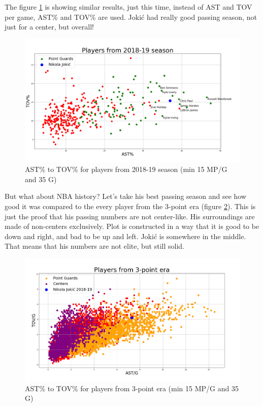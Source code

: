 \documentclass[a4paper]{article}
\begin{document}
The figure \ref{plt:ast_tov_pct} is showing similar results, just this time, instead of AST and TOV per game, AST\% and TOV\% are used. Joki\' c had really good passing season, not just for a center, but overall!

\begin{figure}[h!]
\begin{center}
\includegraphics[scale=0.30]{ast_tov_pct_2019.png}
\end{center}
\caption{AST\% to TOV\% for players from 2018-19 season (min 15 MP/G and 35 G)}
\label{plt:ast_tov_pct}
\end{figure}

But what about NBA history? Let's take his best passing season and see how good it was compared to the every player from the 3-point era (figure \ref{plt:ast_tov_g_3p}). This is just the proof that his passing numbers are not center-like. His surroundings are made of non-centers exclusively. Plot is constructed in a way that it is good to be down and right, and bad to be up and left. Joki\' c is somewhere in the middle. That means that his numbers are not elite, but still solid.

\begin{figure}[h!]
\begin{center}
\includegraphics[scale=0.30]{ast_tov_g_3point_era.png}
\end{center}
\caption{AST\% to TOV\% for players from 3-point era (min 15 MP/G and 35 G)}
\label{plt:ast_tov_g_3p}
\end{figure}
\end{document}
